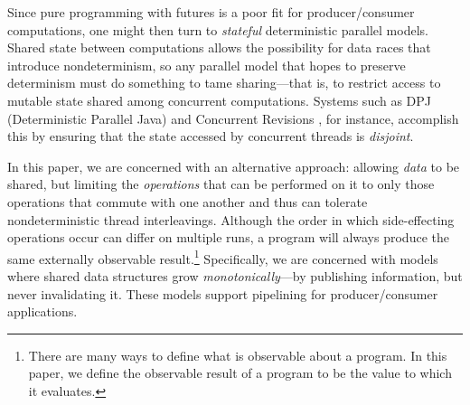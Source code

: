 Since pure programming with futures is a poor fit for
producer/consumer computations, one might then turn to
{\em stateful} deterministic parallel models.  Shared state between
computations allows the possibility for data races that introduce
nondeterminism, so any parallel model that hopes to preserve
determinism must do something to tame sharing---that is, to restrict
access to mutable state shared among concurrent computations.  Systems
such as DPJ (Deterministic Parallel Java) \cite{dpj-hotpar09} and
Concurrent Revisions
\cite{concurrent-revisions-oopsla,concurrent-revisions-haskell11}, for
instance, accomplish this by ensuring that the state accessed by
 concurrent threads is {\em
    disjoint}.

In this paper, we are concerned with an alternative approach: allowing
{\em data} to be shared, but limiting the {\em operations} that can be
performed on it to only those operations that commute with one another
and thus can tolerate nondeterministic thread interleavings.  
Although 
the order in which side-effecting operations occur can differ on
multiple runs,
a program will always produce the same externally
observable result.\footnote{There are many ways to define what is observable
 about a program. In this paper, we define the observable result of a program to
be the value to which it evaluates.}
Specifically, we are concerned with models where
shared data structures grow {\em monotonically}---by publishing
information, but never invalidating it.  These models support pipelining for
producer/consumer applications.

